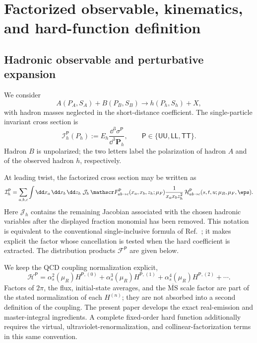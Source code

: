 \section{Factorized observable, kinematics, and hard-function definition}
\label{sec:factorized-observable}

\subsection{Hadronic observable and perturbative expansion}

We consider
\begin{equation}
 A(P_A,S_A)+B(P_B,S_B)\longrightarrow h(P_h,S_h)+X,
 \label{eq:hadronic-process}
\end{equation}
with hadron masses neglected in the short-distance coefficient.  The
single-particle invariant cross section is
\begin{equation}
 \mathcal I_h^{\mathsf P}(P_h)
 :=E_h\frac{\dd^3\sigma^{\mathsf P}}{\dd^3\bm P_h},
 \qquad
 \mathsf P\in\{\mathsf{UU},\mathsf{LL},\mathsf{TT}\}.
 \label{eq:invariant-observable}
\end{equation}
Hadron $B$ is unpolarized; the two letters label the polarization of
hadron $A$ and of the observed hadron $h$, respectively.

At leading twist, the factorized cross section may be written as
\begin{equation}
 \mathcal I_h^{\mathsf P}
 =\sum_{a,b,c}\int\dd x_a\,\dd x_b\,\dd z_h\;
 \mathcal J_h\,
 \mathscr F_{ab\to c}^{\mathsf P}(x_a,x_b,z_h;\mu_F)
 \frac{1}{x_ax_bz_h^2}\,
 \mathcal H_{ab\to c}^{\mathsf P}
 (s,t,u;\mu_R,\mu_F,\eps).
 \label{eq:factorized-cross-section}
\end{equation}
Here $\mathcal J_h$ contains the remaining Jacobian associated with the
chosen hadronic variables after the displayed fraction monomial has been
removed.  This notation is equivalent to the conventional
single-inclusive formula of Ref.~\cite{Aversa:1988vb}; it makes explicit the
factor whose cancellation is tested when the hard coefficient is extracted.
The distribution products $\mathscr F^{\mathsf P}$ are given below.

We keep the QCD coupling normalization explicit,
\begin{equation}
 \mathcal H^{\mathsf P}
 =\alpha_s^2(\mu_R)H^{\mathsf P,(0)}
 +\alpha_s^3(\mu_R)H^{\mathsf P,(1)}
 +\alpha_s^4(\mu_R)H^{\mathsf P,(2)}+\cdots .
 \label{eq:hard-perturbative-expansion}
\end{equation}
Factors of $2\pi$, the flux, initial-state averages, and the
$\overline{\mathrm{MS}}$ scale factor are part of the stated normalization
of each $H^{(n)}$; they are not absorbed into a second definition of the
coupling.  The present paper develops the exact real-emission and
master-integral ingredients.  A complete fixed-order hard function additionally
requires the virtual, ultraviolet-renormalization, and collinear-factorization
terms in this same convention.

